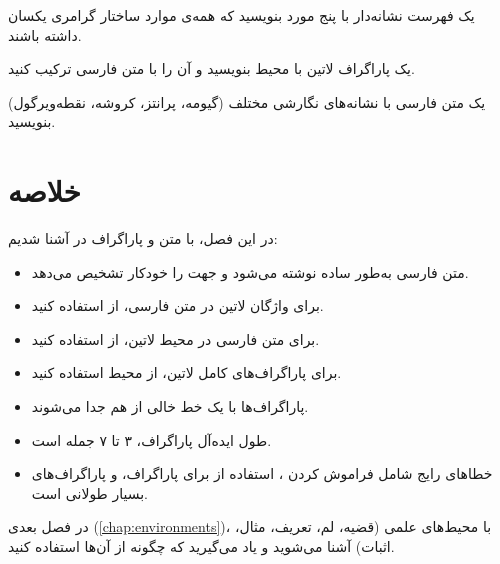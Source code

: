 \begin{exercise}
    یک فهرست نشانه‌دار با پنج مورد بنویسید
    که همه‌ی موارد ساختار گرامری یکسان داشته
    باشند.
    \label{exc:text-list}
\end{exercise}

\begin{exercise}
    یک پاراگراف لاتین با محیط 
    بنویسید و آن را با متن فارسی ترکیب کنید.
    \label{exc:text-latin}
\end{exercise}

\begin{exercise}
    یک متن فارسی با نشانه‌های نگارشی مختلف
    (گیومه، پرانتز، کروشه، نقطه‌ویرگول) بنویسید.
    \label{exc:text-punctuation}
\end{exercise}

\section{خلاصه}
\label{sec:text-summary}

در این فصل، با متن و پاراگراف در 
آشنا شدیم:

\begin{itemize}
    \item متن فارسی به‌طور ساده نوشته می‌شود و
     جهت را خودکار تشخیص می‌دهد.

    \item برای واژگان لاتین در متن فارسی، از
     استفاده کنید.

    \item برای متن فارسی در محیط لاتین، از
     استفاده کنید.

    \item برای پاراگراف‌های کامل لاتین، از
    محیط  استفاده کنید.

    \item پاراگراف‌ها با یک خط خالی از هم جدا
    می‌شوند.

    \item طول ایده‌آل پاراگراف، ۳ تا ۷ جمله
    است.

    \item خطاهای رایج شامل فراموش کردن
    ، استفاده از \cmd{\textbackslash\textbackslash}
    برای پاراگراف، و پاراگراف‌های بسیار طولانی
    است.
\end{itemize}

در فصل بعدی (\cref{chap:environments})، با
محیط‌های علمی (قضیه، لم، تعریف، مثال، اثبات)
آشنا می‌شوید و یاد می‌گیرید که چگونه از آن‌ها
استفاده کنید.